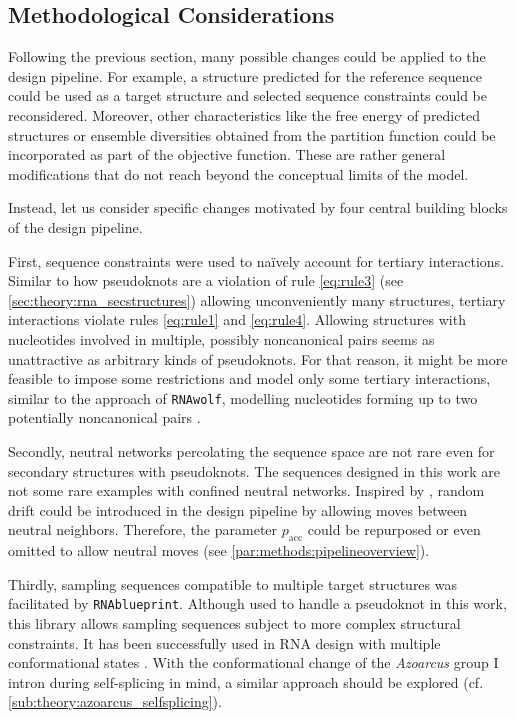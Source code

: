 \documentclass[../../master.tex]{subfiles}
\begin{document}
\subsection{Methodological Considerations}
\label{sub:discussion:methodological}

Following the previous section, many possible changes could be applied to the design pipeline.
For example, a structure predicted for the reference sequence could be used as a target structure and selected sequence constraints could be reconsidered. 
Moreover, other characteristics like the free energy of predicted structures or ensemble diversities obtained from the partition function could be incorporated as part of the objective function.
These are rather general modifications that do not reach beyond the conceptual limits of the model.

Instead, let us consider specific changes motivated by four central building blocks of the design pipeline.

First, sequence constraints were used to na\"{i}vely account for tertiary interactions.
Similar to how pseudoknots are a violation of rule \ref{eq:rule3} (see \autoref{sec:theory:rna_secstructures}) allowing unconveniently many structures, tertiary interactions violate rules \ref{eq:rule1} and \ref{eq:rule4}. 
Allowing structures with nucleotides involved in multiple, possibly noncanonical pairs seems as unattractive as arbitrary kinds of pseudoknots.
For that reason, it might be more feasible to impose some restrictions and model only some tertiary interactions, similar to the approach of \texttt{RNAwolf}, modelling nucleotides forming up to two potentially noncanonical pairs \parencite{zu_siederdissen_folding_2011}.

Secondly, neutral networks percolating the sequence space are not rare even for secondary structures with pseudoknots. 
The sequences designed in this work are not some rare examples with confined neutral networks.
Inspired by \parencite{reidys_generic_1997}, random drift could be introduced in the design pipeline by allowing moves between neutral neighbors.
Therefore, the parameter $p_\mathrm{acc}$ could be repurposed or even omitted to allow neutral moves (see \autoref{par:methods:pipelineoverview}).

Thirdly, sampling sequences compatible to multiple target structures was facilitated by \texttt{RNAblueprint}.
Although used to handle a pseudoknot in this work, this library allows sampling sequences subject to more complex structural constraints. 
It has been successfully used in RNA design with multiple conformational states \parencite{findeis_silico_2018}.
With the conformational change of the \textit{Azoarcus} group I intron during self-splicing in mind, a similar approach should be explored (cf. \autoref{sub:theory:azoarcus_selfsplicing}).
\end{document}
